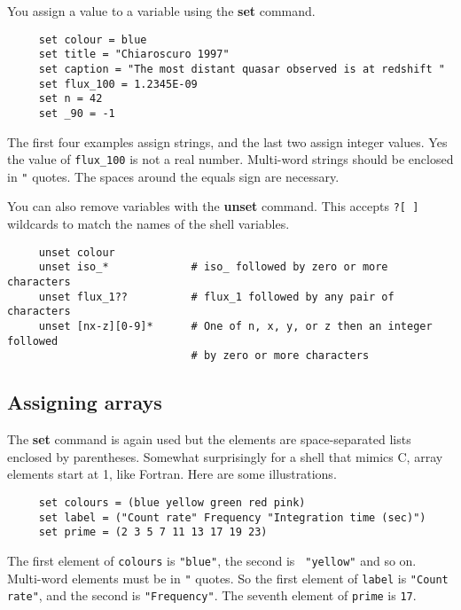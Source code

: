 \documentclass[twoside,11pt]{article}
\newcommand{\htmlref}[2]{#1}
\newcommand{\xlabel}[1]{}
\begin{document}
You assign a value to a variable using the {\bf set} command.

\small
\begin{verbatim}
     set colour = blue
     set title = "Chiaroscuro 1997"
     set caption = "The most distant quasar observed is at redshift "
     set flux_100 = 1.2345E-09
     set n = 42
     set _90 = -1
\end{verbatim}
\normalsize
The first four examples assign strings, and the last two assign integer
values.  Yes the value of {\tt flux\_100} is not a real number.
Multi-word strings should be enclosed in {\tt "} quotes.  The spaces
around the equals sign are necessary.

You can also remove variables with the {\bf unset} command.  This
accepts {\tt *?[~]} \htmlref{\sf wildcards}{sc4_gl_wild} to
\htmlref{{\sf match}}{sc4_gl_match} the names of the 
\htmlref{shell variables}{sc4_se_variables}.

\small
\begin{verbatim}
     unset colour
     unset iso_*             # iso_ followed by zero or more characters
     unset flux_1??          # flux_1 followed by any pair of characters
     unset [nx-z][0-9]*      # One of n, x, y, or z then an integer followed
                             # by zero or more characters
\end{verbatim}
\normalsize


\subsection{\xlabel{sc4_se_assign_array}Assigning arrays
\label{sc4-se:assign_array}}

The {\bf set} command is again used but the elements are space-separated
lists enclosed by parentheses.  Somewhat surprisingly for a shell that
mimics C, array elements start at 1, like Fortran.
Here are some illustrations.

\small
\begin{verbatim}
     set colours = (blue yellow green red pink)
     set label = ("Count rate" Frequency "Integration time (sec)")
     set prime = (2 3 5 7 11 13 17 19 23)
\end{verbatim}
\normalsize
The first element of {\tt colours} is {\tt "blue"}, the second is {\tt
"yellow"} and so on.  Multi-word elements must be in {\tt "} quotes.  So
the first element of {\tt label} is {\tt "Count rate"}, and the second
is {\tt "Frequency"}.  The seventh element of {\tt prime} is {\tt 17}.
\end{document}
